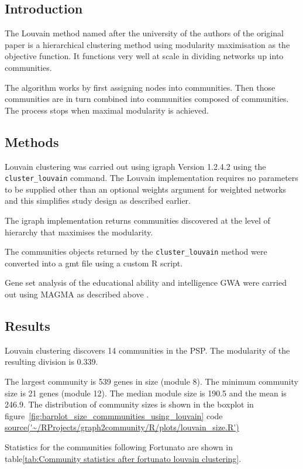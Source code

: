 \subsection{Introduction}
The Louvain method named after the university of the authors of the original paper is a hierarchical clustering method using modularity maximisation as the objective function. It functions very well at scale in dividing networks up into communities.\cite{blondel2008fast}

The algorithm works by first assigning nodes into communities. Then those communities are in turn combined into communities composed of communities. The process stops when maximal modularity is achieved. 

\subsection{Methods}

Louvain clustering was carried out using igraph Version 1.2.4.2 using the \texttt{cluster\_louvain} command. The Louvain implementation requires no parameters to be supplied other than an optional weights argument for weighted networks and this simplifies study design as described earlier. 

The igraph implementation returns communities discovered at the level of hierarchy that maximises the modularity.

The communities objects returned by the \texttt{cluster\_louvain} method were converted into a gmt file using a custom R script.

Gene set analysis of the educational ability and intelligence GWA were carried out using MAGMA as described above . 



\subsection{Results}
Louvain clustering discovers 14 communities in the PSP. The modularity of the resulting division is 0.339. 

The largest community is 539 genes in size (module 8). The minimum community size is 21 genes (module 12). The median module size is 190.5 and the mean is 246.9. The distribution of community sizes is shown in the boxplot in figure~\ref{fig:barplot_size_commmunities_using_louvain} code \url{source('~/RProjects/graph2community/R/plots/louvain_size.R')}

Statistics for the communities following Fortunato \cite{fortunato2016community} are shown in table\ref{tab:Community statistics after fortunato louvain clustering}.


